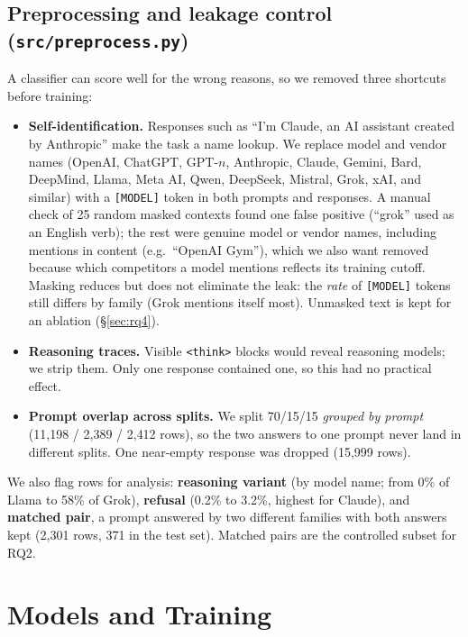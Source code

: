 \documentclass[11pt]{article}
\begin{document}
\subsection{Preprocessing and leakage control (\texttt{src/preprocess.py})}
A classifier can score well for the wrong reasons, so we removed three shortcuts before training:
\begin{itemize}
  \item \textbf{Self-identification.} Responses such as ``I'm Claude, an AI assistant created by Anthropic'' make the task a name lookup. We replace model and vendor names (OpenAI, ChatGPT, GPT-$n$, Anthropic, Claude, Gemini, Bard, DeepMind, Llama, Meta AI, Qwen, DeepSeek, Mistral, Grok, xAI, and similar) with a \texttt{[MODEL]} token in both prompts and responses. A manual check of 25 random masked contexts found one false positive (``grok'' used as an English verb); the rest were genuine model or vendor names, including mentions in content (e.g.\ ``OpenAI Gym''), which we also want removed because which competitors a model mentions reflects its training cutoff. Masking reduces but does not eliminate the leak: the \emph{rate} of \texttt{[MODEL]} tokens still differs by family (Grok mentions itself most). Unmasked text is kept for an ablation (\S\ref{sec:rq4}).
  \item \textbf{Reasoning traces.} Visible \texttt{<think>} blocks would reveal reasoning models; we strip them. Only one response contained one, so this had no practical effect.
  \item \textbf{Prompt overlap across splits.} We split 70/15/15 \emph{grouped by prompt} (11{,}198 / 2{,}389 / 2{,}412 rows), so the two answers to one prompt never land in different splits. One near-empty response was dropped (15{,}999 rows).
\end{itemize}
We also flag rows for analysis: \textbf{reasoning variant} (by model name; from 0\% of Llama to 58\% of Grok), \textbf{refusal} (0.2\% to 3.2\%, highest for Claude), and \textbf{matched pair}, a prompt answered by two different families with both answers kept (2{,}301 rows, 371 in the test set). Matched pairs are the controlled subset for RQ2.

\section{Models and Training}
\end{document}
